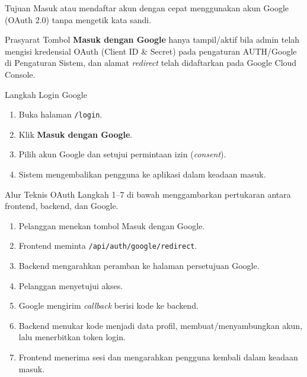 
\begin{flowsection}{Tujuan}
Masuk atau mendaftar akun dengan cepat menggunakan akun Google (OAuth 2.0) tanpa
mengetik kata sandi.
\end{flowsection}

\begin{flowsection}{Prasyarat}
Tombol \textbf{Masuk dengan Google} hanya tampil/aktif bila admin telah mengisi
kredensial OAuth (Client ID \& Secret) pada pengaturan AUTH/Google di Pengaturan
Sistem, dan alamat \emph{redirect} telah didaftarkan pada Google Cloud Console.
\end{flowsection}

\begin{flowsection}{Langkah Login Google}
\begin{enumerate}
  \item Buka halaman \texttt{/login}.
  \item Klik \textbf{Masuk dengan Google}.
  \item Pilih akun Google dan setujui permintaan izin (\emph{consent}).
  \item Sistem mengembalikan pengguna ke aplikasi dalam keadaan masuk.
\end{enumerate}
\end{flowsection}


\begin{flowsection}{Alur Teknis OAuth}
Langkah 1--7 di bawah menggambarkan pertukaran antara frontend, backend, dan
Google.
\begin{enumerate}
  \item Pelanggan menekan tombol Masuk dengan Google.
  \item Frontend meminta \texttt{/api/auth/google/redirect}.
  \item Backend mengarahkan peramban ke halaman persetujuan Google.
  \item Pelanggan menyetujui akses.
  \item Google mengirim \emph{callback} berisi kode ke backend.
  \item Backend menukar kode menjadi data profil, membuat/menyambungkan akun,
        lalu menerbitkan token login.
  \item Frontend menerima sesi dan mengarahkan pengguna kembali dalam keadaan masuk.
\end{enumerate}
\end{flowsection}

